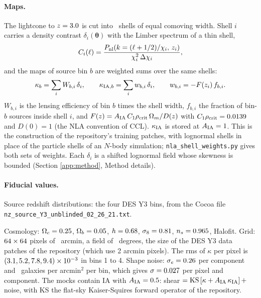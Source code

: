 \documentclass[11pt]{article}
\newcommand{\AIA}{A_{\rm IA}}
\newcommand{\kIA}{\kappa_{\rm IA}}
\begin{document}
\paragraph{Maps.}
The lightcone to $z = 3.0$ is cut into \NShells\ shells of equal comoving width. Shell $i$
carries a density contrast $\delta_i(\boldsymbol\theta)$ with the Limber spectrum of a thin shell,
\begin{equation}
  C_i(\ell) = \frac{P_{\rm nl}\!\left(k = (\ell + 1/2)/\chi_i,\, z_i\right)}{\chi_i^2\,\Delta\chi_i} ,
\end{equation}
and the maps of source bin $b$ are weighted sums over the same shells:
\begin{equation}
  \kappa_b = \sum_i W_{b,i}\,\delta_i , \qquad
  \kappa_{{\rm IA},b} = \sum_i w_{b,i}\,\delta_i , \qquad
  w_{b,i} = -F(z_i)\, f_{b,i} .
  \label{eq:shells}
\end{equation}
$W_{b,i}$ is the lensing efficiency of bin $b$ times the shell width, $f_{b,i}$ the fraction of
bin-$b$ sources inside shell $i$, and
$F(z) = \AIA\, C_1\rho_{\rm crit}\,\Omega_m / D(z)$ with $C_1\rho_{\rm crit} = 0.0139$ and
$D(0) = 1$ (the NLA convention of CCL). $\kIA$ is stored at $\AIA = 1$. This is the
construction of the repository's training patches, with lognormal shells in place of the
particle shells of an $N$-body simulation; \texttt{nla\_shell\_weights.py} gives both sets of
weights. Each $\delta_i$ is a shifted lognormal field whose skewness is bounded (Section
\ref{app:method}, Method details).

\paragraph{Fiducial values.}
Source redshift distributions: the four DES Y3 bins, from the Cocoa file
{\small\texttt{nz\_source\_Y3\_unblinded\_02\_26\_21.txt}}.

\noindent Cosmology: $\Omega_c = 0.25$,
$\Omega_b = 0.05$, $h = 0.68$, $\sigma_8 = 0.81$, $n_s = 0.965$, Halofit.
Grid: $64 \times 64$ pixels of \PixArcmin\ arcmin, a field of \FieldDeg\ degrees, the size
of the DES Y3 data patches of the repository (which use 2 arcmin pixels). The rms of $\kappa$
per pixel is $(3.1, 5.2, 7.8, 9.4) \times 10^{-3}$ in
bins 1 to 4. Shape noise: $\sigma_e = 0.26$ per component and \NEff\ galaxies per
arcmin$^2$ per bin, which gives $\sigma = 0.027$ per pixel and component. The mocks
contain IA with $\AIA = \AInjected$:
shear $= {\rm KS}\left[\kappa + \AIA\,\kIA\right] +$ noise, with KS the flat-sky
Kaiser-Squires forward operator of the repository.
\end{document}
